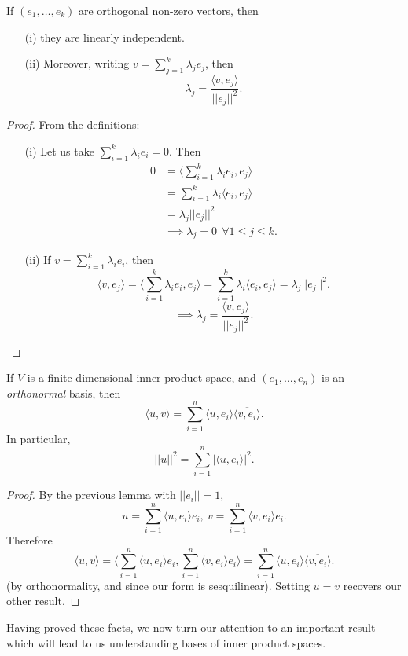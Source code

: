 \documentclass[egregdoesnotlikesansseriftitles,a4paper]{scrartcl}
\begin{document}
\begin{lemma}
      If $\left(e_1, \ldots , e_k\right)$ are orthogonal non-zero vectors, then 
      \begin{itemize}
           \item[(i)] they are linearly independent.
           \item[(ii)] Moreover, writing $v=\sum_{j=1}^{k}\lambda_j e_j$, then 
           \[\lambda_j=\frac{\langle v,e_j \rangle  }{||e_j||^2}.\]
      \end{itemize} 
\end{lemma}
\begin{proof}
     From the definitions:
     \begin{itemize}
          \item[(i)]Let us take $\sum_{i=1}^{k}\lambda_i e_i=0$. Then
          \begin{align*}
               0&= \langle \sum_{i=1}^{k}\lambda_i e_i,e_j \rangle \\&=\sum_{i=1}^{k}\lambda_i \langle e_i,e_j \rangle \\&= \lambda_j ||e_j||^2 \\&\implies \lambda_j=0 \ \ \forall 1 \leq j \leq k.
          \end{align*}
          \item[(ii)] If $v=\sum_{i=1}^{k}\lambda_i e_i$, then 
          \[\langle v,e_j \rangle  =\langle \sum_{i=1}^{k}\lambda_i e_i,e_j \rangle=\sum_{i=1}^{k}\lambda_i \langle e_i,e_j \rangle  =\lambda_j ||e_j||^2 .\]
          \[\implies \lambda_j=\frac{\langle v,e_j \rangle  }{||e_j||^2}.\]
     \end{itemize}
      
\end{proof}

\begin{lemma}
      If $V$ is a finite dimensional inner product space, and $\left(e_1, \ldots ,e_n\right)$ is an \emph{orthonormal} basis, then 
      \[\langle u,v \rangle  =\sum_{i=1}^{n}\langle u,e_i \rangle  \overline{\langle v,e_i \rangle  } .\]
      In particular, 
      \[||u||^2 =\sum_{i=1}^{n}|\langle u,e_i \rangle |^2.\]
\end{lemma}

\begin{proof}
     By the previous lemma with $||e_i||=1$, 
     \[u= \sum_{i=1}^{n}\langle u,e_i \rangle   e_i, \ v= \sum_{i=1}^{n}\langle v,e_i \rangle  e_i.\]
     Therefore 
     \[\langle u,v \rangle  =\langle \sum_{i=1}^{n}\langle u,e_i \rangle   e_i,\sum_{i=1}^{n}\langle v,e_i \rangle  e_i \rangle=\sum_{i=1}^{n}\langle u,e_i \rangle  \overline{\langle v,e_i \rangle  }.\]
     (by orthonormality, and since our form is sesquilinear). Setting $u=v$ recovers our other result.
\end{proof}
Having proved these facts, we now turn our attention to an important result which will lead to us understanding bases of inner product spaces.
\end{document}
